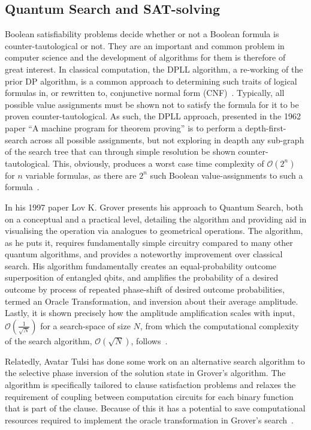 \documentclass[msc,lith,english]{liuthesis}
\begin{document}
\subsection{Quantum Search and SAT-solving}
Boolean satisfiability problems decide whether or not a Boolean formula is counter-tautological or not. They are an important and common problem in computer science and the development of algorithms for them is therefore of great interest. In classical computation, the DPLL algorithm, a re-working of the prior DP algorithm, is a common approach to determining such traits of logical formulas in, or rewritten to, conjunctive normal form (CNF)~\cite{QWSBA}. Typically, all possible value assignments must be shown not to satisfy the formula for it to be proven counter-tautological. As such, the DPLL approach, presented in the 1962 paper ``A machine program for theorem proving'' is to perform a depth-first-search across all possible assignments, but not exploring in deapth any sub-graph of the search tree that can through simple resolution be shown counter-tautological. This, obviously, produces a worst case time complexity of $\mathcal{O}(2^n)$ for $n$ variable formulas, as there are $2^n$ such Boolean value-assignments to such a formula~\cite{DPLL}.  

In his 1997 paper Lov K. Grover presents his approach to Quantum Search, both on a conceptual and a practical level, detailing the algorithm and providing aid in visualising the operation via analogues to geometrical operations. The algorithm, as he puts it, requires fundamentally simple circuitry compared to many other quantum algorithms, and provides a noteworthy improvement over classical search. His algorithm fundamentally creates an equal-probability outcome superposition of entangled qbits, and amplifies the probability of a desired outcome by process of repeated phase-shift of desired outcome probabilities, termed an Oracle Transformation, and inversion about their average amplitude. Lastly, it is shown precisely how the amplitude amplification scales with input, $\mathcal{O}(\frac{1}{\sqrt{N}})$ for a search-space of size $N$, from which the computational complexity of the search algorithm, $\mathcal{O}(\sqrt{N})$, follows~\cite{QMHSNH}.

Relatedly, Avatar Tulsi has done some work on an alternative search algorithm to the selective phase inversion of the solution state in Grover's algorithm. The algorithm is specifically tailored to clause satisfaction problems and relaxes the requirement of coupling between computation circuits for each binary function that is part of the clause. Because of this it has a potential to save computational resources required to implement the oracle transformation in Grover's search~\cite{QuantumCSPSearch}.
\end{document}

